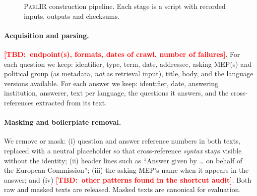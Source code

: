 \documentclass[runningheads]{llncs}
\newcommand{\TBD}[1]{\textcolor{red}{\textbf{[TBD:~#1]}}}
\newcommand{\TBD}[1]{\errmessage{Unresolved TBD: #1}}
\newcommand{\parlir}{\textsc{ParlIR}}
\begin{document}
\begin{figure}[t]
\centering
{}
\caption{\parlir{} construction pipeline. Each stage is a script with
recorded inputs, outputs and checksums.}
\label{fig:pipeline}
\end{figure}

\paragraph{Acquisition and parsing.} \TBD{endpoint(s), formats, dates of
crawl, number of failures}. For each question we keep: identifier, type,
term, date, addressee, asking MEP(s) and political group (as metadata,
\emph{not} as retrieval input), title, body, and the language versions
available. For each answer we keep: identifier, date, answering institution,
answerer, text per language, the questions it answers, and the cross-references
extracted from its text.

\paragraph{Masking and boilerplate removal.}\label{sec:masking}
We remove or mask: (i) question and answer reference numbers in both texts,
replaced with a neutral placeholder so that cross-reference \emph{syntax}
stays visible without the identity; (ii) header lines such as
``Answer given by \ldots{} on behalf of the European Commission''; (iii)
the asking MEP's name when it appears in the answer; and (iv)
\TBD{other patterns found in the shortcut audit}. Both raw and masked texts
are released. Masked texts are canonical for evaluation.
\end{document}
